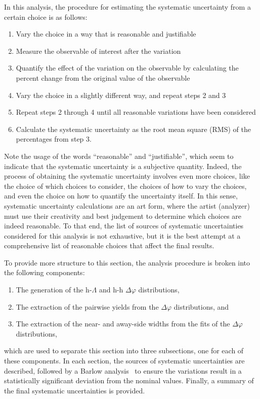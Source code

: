 In this analysis, the procedure for estimating the systematic uncertainty from a certain choice is as follows:
%
\begin{enumerate}
    \item Vary the choice in a way that is reasonable and justifiable 
    \item Measure the observable of interest after the variation
    \item Quantify the effect of the variation on the observable by calculating the percent change from the original value of the observable
    \item Vary the choice in a slightly different way, and repeat steps 2 and 3
    \item Repeat steps 2 through 4 until all reasonable variations have been considered
    \item Calculate the systematic uncertainty as the root mean square (RMS) of the percentages from step 3.
\end{enumerate}
%
Note the usage of the words ``reasonable'' and ``justifiable'', which seem to indicate that the systematic uncertainty is a subjective quantity. Indeed, the process of obtaining the systematic uncertainty involves even more choices, like the choice of which choices to consider, the choices of how to vary the choices, and even the choice on how to quantify the uncertainty itself. In this sense, systematic uncertainty calculations are an art form, where the artist (analyzer) must use their creativity and best judgement to determine which choices are indeed reasonable. To that end, the list of sources of systematic uncertainties considered for this analysis is not exhaustive, but it is the best attempt at a comprehensive list of reasonable choices that affect the final results. 

To provide more structure to this section, the analysis procedure is broken into the following components:
%
\begin{enumerate}
\item The generation of the h-$\Lambda$ and h-h $\Delta\varphi$ distributions,
\item The extraction of the pairwise yields from the $\Delta\varphi$ distributions, and 
\item The extraction of the near- and away-side widths from the fits of the $\Delta\varphi$ distributions,
\end{enumerate}
%
which are used to separate this section into three subsections, one for each of these components. In each section, the sources of systematic uncertainties are described, followed by a Barlow analysis~\cite{BarlowCheck} to ensure the variations result in a statistically significant deviation from the nominal values. Finally, a summary of the final systematic uncertainties is provided.

